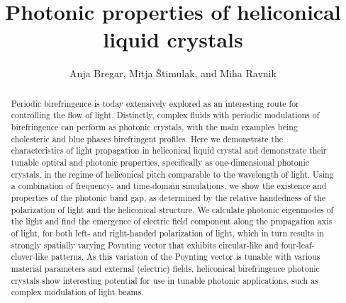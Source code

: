 \documentclass{osa-article}
\begin{document}
\title{Photonic properties of heliconical liquid crystals}

\author{Anja Bregar, Mitja \v{S}timulak, and Miha Ravnik}

\address{Department of Physics, University of Ljubljana, Jadranska 19, 1000 Ljubljana, Slovenia\\
Gorenje d.d., Partizanska cesta 12, 3320 Velenje, Slovenia\\
Jo\v{z}ef Stefan Institute, Jamova 39, 1000 Ljubljana, Slovenia}




\begin{abstract}
Periodic birefringence is today extensively explored as an interesting route for controlling the flow of light. 
Distinctly, complex fluids with periodic modulations of birefringence can perform as photonic crystals, with the main examples being cholesteric and blue phases birefringent profiles. 
Here we demonstrate the characteristics of light propagation in heliconical liquid crystal and demonstrate their tunable optical and photonic properties, specifically as one-dimensional photonic crystals, in the regime of heliconical pitch comparable to the wavelength of light.
Using a combination of frequency- and time-domain simulations, we show the existence and properties of the photonic band gap, as determined by the relative handedness of the polarization of light and the heliconical structure. 
We calculate photonic eigenmodes of the light and find the emergence of electric field component along the propagation axis of light, for both left- and right-handed polarization of light, which in turn results in strongly spatially varying Poynting vector that exhibits circular-like and four-leaf-clover-like patterns. 
As this variation of the Poynting vector is tunable with various material parameters and external (electric) fields, heliconical birefringence photonic crystals show interesting potential for use in tunable photonic applications, such as complex modulation of light beams.
\end{abstract}
\end{document}

